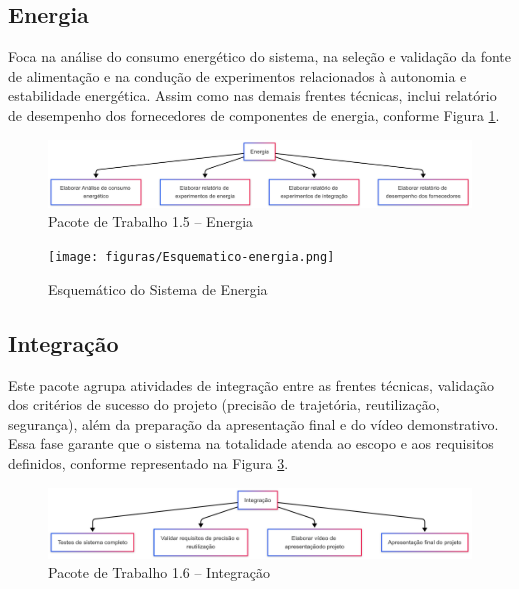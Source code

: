 \subsection{Energia}

Foca na análise do consumo energético do sistema, na seleção e validação da fonte de alimentação e na condução de experimentos relacionados à autonomia e estabilidade energética. Assim como nas demais frentes técnicas, inclui relatório de desempenho dos fornecedores de componentes de energia, conforme Figura \ref{fig_eap_energia}.

\begin{figure}[!h]
	\centering
\includegraphics[width=15cm]{figuras/eap_energia.png}
	\caption{Pacote de Trabalho 1.5 – Energia}
	\label{fig_eap_energia} 
\end{figure}

\begin{figure}[h!]
    \centering
    \texttt{[image: figuras/Esquematico-energia.png]}
    \caption{Esquemático do Sistema de Energia}
    \label{fig_esquematico_energia}
\end{figure}

\newpage

\subsection{Integração}


Este pacote agrupa atividades de integração entre as frentes técnicas, validação dos critérios de sucesso do projeto (precisão de trajetória, reutilização, segurança), além da preparação da apresentação final e do vídeo demonstrativo. Essa fase garante que o sistema na totalidade atenda ao escopo e aos requisitos definidos, conforme representado na Figura \ref{fig_eap_integracao}.

\begin{figure}[!h]
	\centering
\includegraphics[width=15cm]{figuras/eap_integracao.png}
	\caption{Pacote de Trabalho 1.6 – Integração}
	\label{fig_eap_integracao}  
\end{figure}
